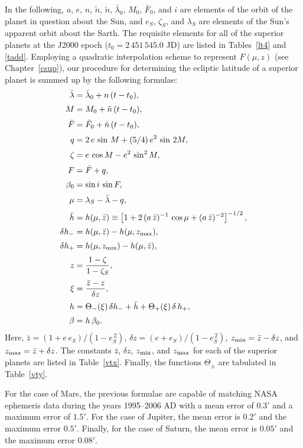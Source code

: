 In the following, $a$, $e$, $n$, $\tilde{n}$, $\breve{n}$, $\bar{\lambda}_0$, $M_0$,  $\bar{F}_0$, and $i$ are  elements of the orbit of the planet in question
about the Sun, and $e_S$, $\zeta_S$, and $\lambda_S$  are elements of the Sun's apparent orbit
about the Sarth. 
The requisite elements for all of the superior planets at the J2000 epoch ($t_0=2\,451\,545.0$ JD)
are listed in Tables~\ref{lt4} and \ref{tadd}.
Employing a quadratic interpolation scheme to represent
$F(\mu,z)$ (see Chapter~\ref{csup}), our procedure for determining the ecliptic latitude of a
superior planet is summed up by the following formulae:
\begin{align}
\bar{\lambda}&=  \bar{\lambda}_0 + n\,(t-t_0) ,\\[0.5ex]
M &= M_0  +\tilde{n}\,(t-t_0),\\[0.5ex]
\bar{F} &= \bar{F}_0 + \breve{n}\,(t-t_0),\\[0.5ex]
q&= 2\,e\,\sin \,M + (5/4)\,e^2\,\sin\,2M,\\[0.5ex]
\zeta &= e\,\cos M - e^2\,\sin^2 M,\\[0.5ex]
F &=\bar{F} + q,\\[0.5ex]
\beta_0  &= \sin i\,\sin F,\\[0.5ex]
\mu&= \lambda_S - \bar{\lambda}-q,\\[0.5ex]
\bar{h} &= h(\mu,\bar{z})\equiv\left[1 + 2\,(a\,\bar{z})^{-1}\,\cos\mu+ (a\,\bar{z})^{-2}\right]^{-1/2},\\[0.5ex]
\delta h_- &= h(\mu,\bar{z}) - h(\mu,z_{\rm max}),\\[0.5ex]
\delta h_+&=h(\mu,z_{\rm min}) - h(\mu,\bar{z}),\\[0.5ex]
z &= \frac{1-\zeta}{1-\zeta_S},\\[0.5ex]
\xi &= \frac{\bar{z}-z}{\delta z},\\[0.5ex]
h  &=\Theta_-(\xi)\,\delta h_-+ \bar{h}
+ \Theta_+(\xi)\,\delta\,h_+,\\[0.5ex]
\beta &= h\,\beta_0.
\end{align}
Here, $\bar{z} = (1+e\,e_S)/(1-e_S^{\,2})$, $\delta z = (e+e_S)/(1-e_S^{\,2})$, $z_{\rm min} = \bar{z}-\delta z$,
and $z_{\rm max} = \bar{z}+\delta z$. The constants $\bar{z}$, $\delta z$, $z_{\rm min}$, and $z_{\rm max}$ 
for each of the superior planets are listed in Table~\ref{vtx}.  Finally, the functions $\Theta_\pm$ are  tabulated in Table~\ref{vty}.

For the case of Mars, the previous formulae are capable of matching NASA ephemeris data during the years 1995--2006 AD
with a mean error of $0.3'$ and a maximum error of $1.5'$. For the case of Jupiter, the mean error is
$0.2'$ and the maximum error $0.5'$. Finally, for the case of Saturn, the mean error is $0.05'$ and the
maximum error $0.08'$. 

